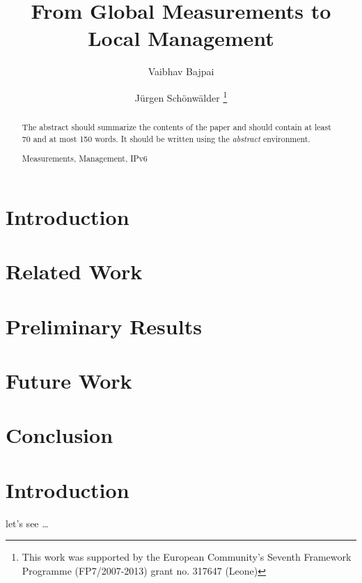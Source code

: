 \documentclass[runningheads,a4paper]{llncs}
\newcommand{\keywords}[1]{\par\addvspace\baselineskip
\noindent\keywordname\enspace\ignorespaces#1}
\begin{document}
\mainmatter  %

\title{From Global Measurements to Local Management}

\author{Vaibhav Bajpai \and Jürgen Schönwälder%
\thanks{This work was supported by the European Community’s Seventh Framework
Programme (FP7/2007-2013) grant no. 317647 (Leone)}}
\maketitle

\begin{abstract}
The abstract should summarize the contents of the paper and should
contain at least 70 and at most 150 words. It should be written using the
\emph{abstract} environment.
\keywords{Measurements, Management, IPv6}
\end{abstract}


\section{Introduction}
\label{sec:introduction}
\section{Related Work}
\label{sec:relatedwork}
\section{Preliminary Results}
\label{sec:preliminaryresults}
\section{Future Work}\label{sec:futurework}

\section{Conclusion}
\label{sec:conclusion}





\section{Introduction} let's see \cite{sundaresan:2011} \ldots



\end{document}
